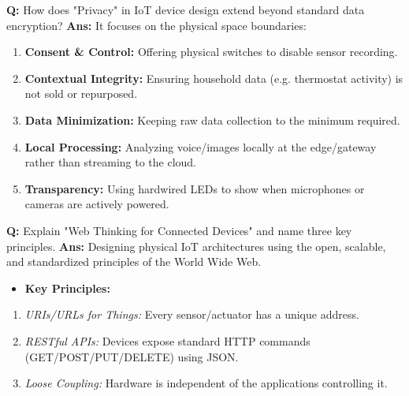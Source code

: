 \documentclass[10pt,a4paper,twocolumn]{article}
\begin{document}
\begin{tcolorbox}[
  colback=white,
  colframe=UnitColorTwo,
  colbacktitle=gray!10!white,
  coltitle=black,
  fonttitle=\bfseries\sffamily\small,
  title={Unit II $\bullet$ Card 10},
  boxrule=1.2pt,
  arc=2mm,
  outer arc=2mm,
  boxsep=1.5mm,
  top=1mm,
  bottom=1mm,
  left=1.5mm,
  right=1.5mm,
  before skip=2.5mm,
  after skip=2.5mm
]
\textbf{Q:} How does "Privacy" in IoT device design extend beyond standard data encryption?
\tcbline
\textbf{Ans:} It focuses on the physical space boundaries:  
\begin{enumerate}
  \item \textbf{Consent \& Control:} Offering physical switches to disable sensor recording.
  \item \textbf{Contextual Integrity:} Ensuring household data (e.g. thermostat activity) is not sold or repurposed.
  \item \textbf{Data Minimization:} Keeping raw data collection to the minimum required.
  \item \textbf{Local Processing:} Analyzing voice/images locally at the edge/gateway rather than streaming to the cloud.
  \item \textbf{Transparency:} Using hardwired LEDs to show when microphones or cameras are actively powered.
\end{enumerate}
\end{tcolorbox}


\begin{tcolorbox}[
  colback=white,
  colframe=UnitColorTwo,
  colbacktitle=gray!10!white,
  coltitle=black,
  fonttitle=\bfseries\sffamily\small,
  title={Unit II $\bullet$ Card 11},
  boxrule=1.2pt,
  arc=2mm,
  outer arc=2mm,
  boxsep=1.5mm,
  top=1mm,
  bottom=1mm,
  left=1.5mm,
  right=1.5mm,
  before skip=2.5mm,
  after skip=2.5mm
]
\textbf{Q:} Explain "Web Thinking for Connected Devices" and name three key principles.
\tcbline
\textbf{Ans:} Designing physical IoT architectures using the open, scalable, and standardized principles of the World Wide Web.  
\begin{itemize}
  \item   \textbf{Key Principles:}
\end{itemize}
\begin{enumerate}
  \item \textit{URIs/URLs for Things:} Every sensor/actuator has a unique address.
  \item \textit{RESTful APIs:} Devices expose standard HTTP commands (GET/POST/PUT/DELETE) using JSON.
  \item \textit{Loose Coupling:} Hardware is independent of the applications controlling it.
\end{enumerate}
\end{tcolorbox}
\end{document}
